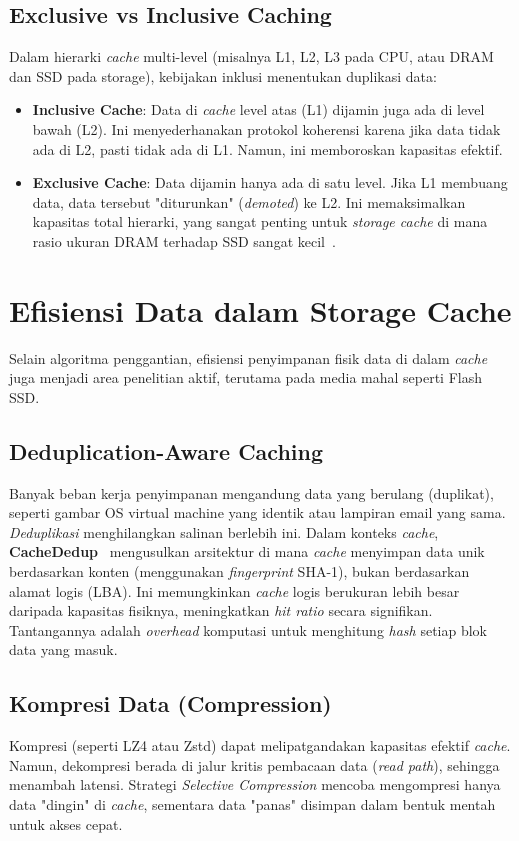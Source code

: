\subsection{Exclusive vs Inclusive Caching}
Dalam hierarki \textit{cache} multi-level (misalnya L1, L2, L3 pada CPU,
atau DRAM dan SSD pada storage), kebijakan inklusi menentukan duplikasi data:
\begin{itemize}
  \item \textbf{Inclusive Cache}: Data di \textit{cache} level atas (L1)
    dijamin juga ada di level bawah (L2). Ini menyederhanakan protokol koherensi
    karena jika data tidak ada di L2, pasti tidak ada di L1. Namun, ini
    memboroskan kapasitas efektif.
  \item \textbf{Exclusive Cache}: Data dijamin hanya ada di satu level.
    Jika L1 membuang data, data tersebut "diturunkan" (\textit{demoted})
    ke L2. Ini memaksimalkan kapasitas total hierarki, yang sangat penting
    untuk \textit{storage cache} di mana rasio ukuran DRAM terhadap
    SSD sangat kecil~\cite{Soundararajan2008Exclusivity}.
\end{itemize}

\section{Efisiensi Data dalam Storage Cache}
Selain algoritma penggantian, efisiensi penyimpanan fisik data di dalam
\textit{cache} juga menjadi area penelitian aktif, terutama pada media
mahal seperti Flash SSD.

\subsection{Deduplication-Aware Caching}
Banyak beban kerja penyimpanan mengandung data yang berulang (duplikat),
seperti gambar OS virtual machine yang identik atau lampiran email yang
sama. \textit{Deduplikasi} menghilangkan salinan berlebih ini.
Dalam konteks \textit{cache}, \textbf{CacheDedup}~\cite{Li2016CacheDedup}
mengusulkan arsitektur di mana \textit{cache} menyimpan data unik berdasarkan
konten (menggunakan \textit{fingerprint} SHA-1), bukan berdasarkan alamat
logis (LBA). Ini memungkinkan \textit{cache} logis berukuran lebih besar
daripada kapasitas fisiknya, meningkatkan \textit{hit ratio} secara signifikan.
Tantangannya adalah \textit{overhead} komputasi untuk menghitung \textit{hash}
setiap blok data yang masuk.

\subsection{Kompresi Data (Compression)}
Kompresi (seperti LZ4 atau Zstd) dapat melipatgandakan kapasitas efektif
\textit{cache}. Namun, dekompresi berada di jalur kritis pembacaan data
(\textit{read path}), sehingga menambah latensi. Strategi
\textit{Selective Compression}
mencoba mengompresi hanya data "dingin" di \textit{cache}, sementara data
"panas" disimpan dalam bentuk mentah untuk akses cepat.

